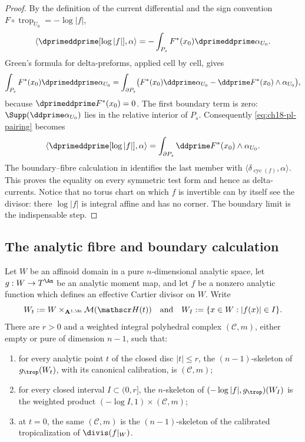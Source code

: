 \begin{proof}
By the definition of the current differential and the sign convention
$F\circ\operatorname{trop}_{U_0}=-\log|f|$,
\begin{equation}
\label{eq:ch18-pl-pairing}
 \left\langle\dprimeddprime[\log|f|],\alpha\right\rangle
       =-\int_{P_s}F^*(x_0)\dprimeddprime\alpha_{U_0}.
\end{equation}
Green's formula for delta-preforms, applied cell by cell, gives
\[
 \int_{P_s}F^*(x_0)\dprimeddprime\alpha_{U_0}
 =\int_{\partial P_s}
     \bigl(F^*(x_0)\ddprime\alpha_{U_0}
       -\ddprime F^*(x_0)\wedge\alpha_{U_0}\bigr),
\]
because $\dprimeddprime F^*(x_0)=0$.  The first boundary term is zero:
$\Supp(\ddprime\alpha_{U_0})$ lies in the relative interior of $P_s$.
Consequently \eqref{eq:ch18-pl-pairing} becomes
\begin{equation}
\label{eq:ch18-pl-boundary-pairing}
 \left\langle\dprimeddprime[\log|f|],\alpha\right\rangle
   =\int_{\partial P_s}\ddprime F^*(x_0)\wedge\alpha_{U_0}.
\end{equation}
The boundary--fibre calculation in
 identifies the last member with
$\langle\delta_{\operatorname{cyc}(f)},\alpha\rangle$.  This proves the
equality on every symmetric test form and hence as delta-currents.  Notice
that no torus chart on which $f$ is invertible can by itself see the divisor:
there $\log|f|$ is integral affine and has no corner.  The boundary limit is
the indispensable step.
\end{proof}

\subsection{The analytic fibre and boundary calculation}
\label{sec:ch18-pl-ingredients}

\begin{lemma}
\label{lem:ch18-fibre-cylinder}
Let $W$ be an affinoid domain in a pure $n$-dimensional analytic space,
let $g:W\to T^{\An}$ be an analytic moment map, and let $f$ be a nonzero
analytic function which defines an effective Cartier divisor on $W$.
Write
\[
 W_t:=W\mathbin{\times}_{\mathbf A^{1,\An}}\mathcal M(\mathscr H(t))
 \quad\text{and}\quad
 W_I:=\{x\in W:|f(x)|\in I\}.
\]
There are $r>0$ and a weighted integral polyhedral complex
$(\mathscr C,m)$, either empty or pure of dimension $n-1$, such that:
\begin{enumerate}
\item for every analytic point $t$ of the closed disc $|t|\leq r$, the
 $(n-1)$-skeleton of $g_{\trop}(W_t)$, with its canonical calibration, is
 $(\mathscr C,m)$;
\item for every closed interval $I\subset(0,r]$, the $n$-skeleton of
 $(-\log|f|,g_{\trop})(W_I)$ is the weighted product
 $(-\log I,1)\times(\mathscr C,m)$;
\item at $t=0$, the same $(\mathscr C,m)$ is the $(n-1)$-skeleton of the
 calibrated tropicalization of $\divis(f|_W)$.
\end{enumerate}
\end{lemma}

